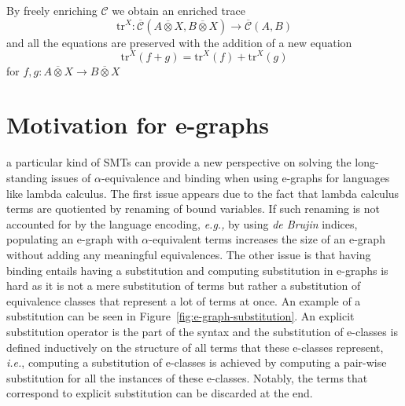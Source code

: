 \documentclass[acmsmall, screen, nonacm]{acmart}
\newcommand\enriched[1]{{\overline{\mathcal{#1}}}}
\begin{document}
By freely enriching $\mathcal{C}$ we obtain an enriched trace
\[
\text{tr}^{X} : \enriched{C}(A \overline{\otimes} X, B \overline{\otimes} X) \to \enriched{C}(A,B)
\]
and all the equations are preserved with the addition of a new equation
\[
  \text{tr}^{X}(f + g) = \text{tr}^{X}(f) + \text{tr}^{X}(g)
\]
for $f,g : A \overline{\otimes} X \to B \overline{\otimes} X$


\section{Motivation for e-graphs}

a particular kind of SMTs can provide a new perspective on solving the long-standing issues of $\alpha$-equivalence and binding when using e-graphs for languages like lambda calculus.
The first issue appears due to the fact that lambda calculus terms are quotiented by renaming of bound variables.
If such renaming is not accounted for by the language encoding, \textit{e.g.,} by using \textit{de Brujin} indices, populating an e-graph with $\alpha$-equivalent terms increases the size of an e-graph without adding any meaningful equivalences.
The other issue is that having binding entails having a substitution and computing substitution in e-graphs is hard as it is not a mere substitution of terms but rather a substitution of equivalence classes that represent a lot of terms at once.
An example of a substitution can be seen in Figure~\ref{fig:e-graph-substitution}. An explicit substitution operator is the part of the syntax and the substitution of e-classes is defined inductively on the structure of all terms that these e-classes represent, \textit{i.e.}, computing a substitution of e-classes is achieved by computing a pair-wise substitution for all the instances of these e-classes.
Notably, the terms that correspond to explicit substitution can be discarded at the end.
\end{document}
